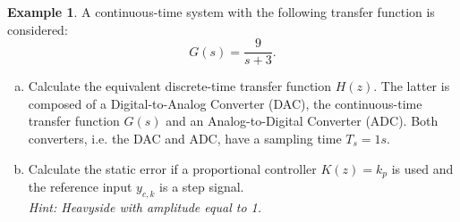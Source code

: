 \documentclass[a4paper,12 pt]{article}
\numberwithin{equation}{section}
\theoremstyle{definition}
\newtheorem{bsp}{Example}
\theoremstyle{remark}
\theoremstyle{definition}
\theoremstyle{definition}
\theoremstyle{definition}
\theoremstyle{remark}
\begin{document}
\begin{bsp}
A continuous-time system with the following transfer function is considered:
\begin{equation*}
G(s)=\frac{9}{s+3}.
\end{equation*}
\begin{enumerate}[(a)]
\item Calculate the equivalent discrete-time transfer function $H(z)$. The latter is composed of a Digital-to-Analog Converter (DAC), the continuous-time transfer function $G(s)$ and an Analog-to-Digital Converter (ADC). Both converters, i.e. the DAC and ADC, have a sampling time $T_s=1s$.
\item Calculate the static error if a proportional controller $K(z)=k_p$ is used and the reference input $y_{c,k}$ is a step signal. \\
\textit{Hint: Heavyside with amplitude equal to 1.}
\end{enumerate}


\end{bsp}
\end{document}
